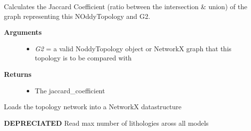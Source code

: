\documentclass[a4paper,10pt,english]{sphinxmanual}
\begin{document}
\begin{fulllineitems}
\begin{fulllineitems}
\end{fulllineitems}


\begin{fulllineitems}
\label{pynoddy:pynoddy.output.NoddyTopology.jaccard_coefficient}
Calculates the Jaccard Coefficient (ratio between the intersection \& union) of the graph representing this NOddyTopology and G2.
\begin{description}
\item[{\textbf{Arguments}}] \leavevmode\begin{itemize}
\item {} 
\emph{G2} = a valid NoddyTopology object or NetworkX graph that this topology is to be compared with

\end{itemize}

\item[{\textbf{Returns}}] \leavevmode\begin{itemize}
\item {} 
The jaccard\_coefficient

\end{itemize}

\end{description}

\end{fulllineitems}


\begin{fulllineitems}
\label{pynoddy:pynoddy.output.NoddyTopology.loadNetwork}
Loads the topology network into a NetworkX datastructure

\end{fulllineitems}


\begin{fulllineitems}
\label{pynoddy:pynoddy.output.NoddyTopology.read_adjacency_matrix}
\textbf{DEPRECIATED}
Read max number of lithologies aross all models

\end{fulllineitems}



\end{fulllineitems}
\end{document}
